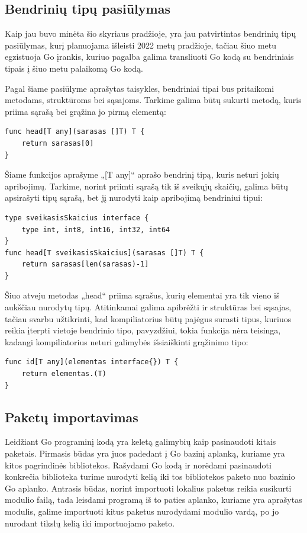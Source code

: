 \documentclass{VUMIFPSkursinis}
\begin{document}
\subsection{Bendrinių tipų pasiūlymas}
Kaip jau buvo minėta šio skyriaus pradžioje, yra jau patvirtintas bendrinių tipų pasiūlymas, kurį planuojama išleisti 2022 metų pradžioje, tačiau šiuo metu egzistuoja Go įrankis, kuriuo pagalba galima transliuoti Go kodą su bendriniais tipais į šiuo metu palaikomą Go kodą.\par Pagal šiame pasiūlyme aprašytas taisykles, bendriniai tipai bus pritaikomi metodams, struktūroms bei sąsajoms. Tarkime galima būtų sukurti metodą, kuris priima sąrašą bei grąžina jo pirmą elementą:
\begin{lstlisting}[language=GoCust] 
func head[T any](sarasas []T) T {
	return sarasas[0]
}
	\end{lstlisting}
Šiame funkcijos aprašyme „[T any]“ aprašo bendrinį tipą, kuris neturi jokių apribojimų. Tarkime, norint priimti sąrašą tik iš sveikųjų skaičių, galima būtų apsirašyti tipų sąrašą, bet jį nurodyti kaip apribojimą bendriniui tipui:
\begin{lstlisting}[language=GoCust]
type sveikasisSkaicius interface {
	type int, int8, int16, int32, int64
}
func head[T sveikasisSkaicius](sarasas []T) T {
	return sarasas[len(sarasas)-1]
}
	\end{lstlisting}
	Šiuo atveju metodas „head“ priima sąrašus, kurių elementai yra tik vieno iš aukščiau nurodytų tipų. Atitinkamai galima apibrėžti ir struktūras bei sąsajas, tačiau svarbu užtikrinti, kad kompiliatorius būtų pajėgus surasti tipus, kuriuos reikia įterpti vietoje bendrinio tipo, pavyzdžiui, tokia funkcija nėra teisinga, kadangi kompiliatorius neturi galimybės išsiaiškinti grąžinimo tipo:
	\begin{lstlisting}[language=GoCust] 
func id[T any](elementas interface{}) T {
	return elementas.(T)
}
\end{lstlisting}
\subsection{Paketų importavimas}
Leidžiant Go programinį kodą yra keletą galimybių kaip pasinaudoti kitais paketais. Pirmasis būdas yra juos padedant į Go bazinį aplanką, kuriame yra kitos pagrindinės bibliotekos. Rašydami Go kodą ir norėdami pasinaudoti konkrečia biblioteka turime nurodyti kelią iki tos bibliotekos paketo nuo bazinio Go aplanko. Antrasis būdas, norint importuoti lokalius paketus reikia susikurti modulio failą, tada leisdami programą iš to paties aplanko, kuriame yra aprašytas modulis, galime importuoti kitus paketus nurodydami modulio vardą, po jo nurodant tikslų kelią iki importuojamo paketo.
\end{document}
